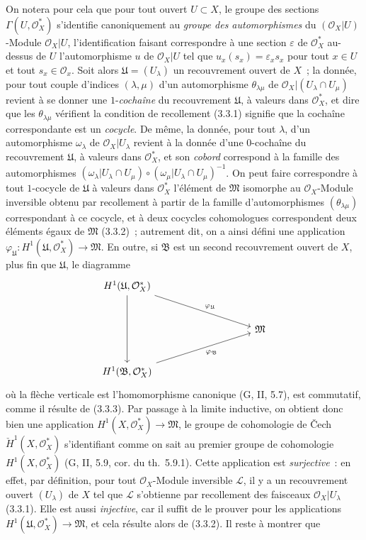\begin{env}[5.4.7]
On notera pour cela que pour tout ouvert $U\subset X$, le groupe des sections
$\Gamma(U,\mathcal{O}_X^*)$ s'identifie canoniquement au \emph{groupe des
automorphismes} du $(\mathcal{O}_X|U)$-Module $\mathcal{O}_X|U$,
l'identification faisant correspondre à une section $\varepsilon$ de
$\mathcal{O}_X^*$ au-dessus de $U$ l'automorphisme $u$ de $\mathcal{O}_X|U$
tel que $u_x(s_x)=\varepsilon_xs_x$ pour tout $x\in U$ et tout
$s_x\in\mathcal{O}_x$. Soit alors $\mathfrak{U}=(U_\lambda)$ un recouvrement
ouvert de $X$~; la donnée, pour tout couple d'indices $(\lambda,\mu)$ d'un
automorphisme $\theta_{\lambda\mu}$ de
$\mathcal{O}_X|(U_\lambda\cap U_\mu)$ revient à se donner une
$1$-\emph{cochaîne} du recouvrement $\mathfrak{U}$, à valeurs dans
$\mathcal{O}_X^*$, et dire que les $\theta_{\lambda\mu}$ vérifient la
condition de recollement (3.3.1) signifie que la cochaîne correspondante est
un \emph{cocycle}. De même, la donnée, pour tout $\lambda$, d'un automorphisme
$\omega_\lambda$ de $\mathcal{O}_X|U_\lambda$ revient à la donnée d'une
$0$-cochaîne du recouvrement $\mathfrak{U}$, à valeurs dans
$\mathcal{O}_X^*$, et son \emph{cobord} correspond à la famille des
automorphismes
$(\omega_\lambda|U_\lambda\cap U_\mu)\circ
 (\omega_\mu|U_\lambda\cap U_\mu)^{-1}$.
On peut faire correspondre à tout $1$-cocycle de $\mathfrak{U}$ à valeurs
dans $\mathcal{O}_X^*$ l'élément de $\mathfrak{M}$ isomorphe au
$\mathcal{O}_X$-Module inversible obtenu par recollement à partir de la
famille d'automorphismes $(\theta_{\lambda\mu})$ correspondant à ce cocycle,
et à deux cocycles cohomologues correspondent deux éléments égaux de
$\mathfrak{M}$ (3.3.2)~; autrement dit, on a ainsi défini une application
$\varphi_{\mathfrak{U}}:H^1(\mathfrak{U},\mathcal{O}_X^*)\to\mathfrak{M}$.
En outre, si $\mathfrak{B}$ est un second recouvrement ouvert de $X$, plus fin
que $\mathfrak{U}$, le diagramme
\[
\begin{tikzcd}[column sep=huge,row sep=large]
H^1(\mathfrak{U},\mathcal{O}_X^*)
  \arrow[dd]
  \arrow[rrd,"\varphi_{\mathfrak{U}}"] & & \\
& & \mathfrak{M} \\
H^1(\mathfrak{B},\mathcal{O}_X^*)
  \arrow[rru,swap,"\varphi_{\mathfrak{B}}"] & &
\end{tikzcd}
\]
où la flèche verticale est l'homomorphisme canonique (G, II, 5.7), est
commutatif, comme il résulte de (3.3.3). Par passage à la limite inductive, on
obtient donc bien une application
$H^1(X,\mathcal{O}_X^*)\to\mathfrak{M}$, le groupe de cohomologie de \v{C}ech
$\check{H}^1(X,\mathcal{O}_X^*)$ s'identifiant comme on sait au premier groupe
de cohomologie $H^1(X,\mathcal{O}_X^*)$ (G, II, 5.9, cor. du th.~5.9.1).
Cette application est \emph{surjective}~: en effet, par définition, pour tout
$\mathcal{O}_X$-Module inversible $\mathcal{L}$, il y a un recouvrement ouvert
$(U_\lambda)$ de $X$ tel que $\mathcal{L}$ s'obtienne par recollement des
faisceaux $\mathcal{O}_X|U_\lambda$ (3.3.1). Elle est aussi
\emph{injective}, car il suffit de le prouver pour les applications
$H^1(\mathfrak{U},\mathcal{O}_X^*)\to\mathfrak{M}$, et cela résulte alors de
(3.3.2). Il reste à montrer que


\end{env}
